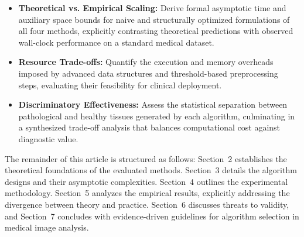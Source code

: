 \begin{itemize}
  \item \textbf{Theoretical vs. Empirical Scaling:} Derive formal asymptotic time and auxiliary space bounds for naive and structurally optimized formulations of all four methods, explicitly contrasting theoretical predictions with observed wall-clock performance on a standard medical dataset.
  \item \textbf{Resource Trade-offs:} Quantify the execution and memory overheads imposed by advanced data structures and threshold-based preprocessing steps, evaluating their feasibility for clinical deployment.
  \item \textbf{Discriminatory Effectiveness:} Assess the statistical separation between pathological and healthy tissues generated by each algorithm, culminating in a synthesized trade-off analysis that balances computational cost against diagnostic value.
\end{itemize}

The remainder of this article is structured as follows: Section~2 establishes the theoretical foundations of the evaluated methods. Section~3 details the algorithm designs and their asymptotic complexities. Section~4 outlines the experimental methodology. Section~5 analyzes the empirical results, explicitly addressing the divergence between theory and practice. Section~6 discusses threats to validity, and Section~7 concludes with evidence-driven guidelines for algorithm selection in medical image analysis.